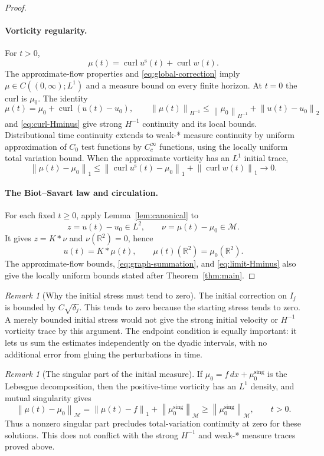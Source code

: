 \documentclass[11pt,a4paper,reqno]{amsart}
\theoremstyle{plain}
\theoremstyle{definition}
\theoremstyle{remark}
\newtheorem{remark}[theorem]{Remark}
\numberwithin{equation}{section}
\newcommand{\R}{\mathbb R}
\newcommand{\M}{\mathcal M}
\newcommand{\curl}{\operatorname{curl}}
\newcommand{\norm}[2]{\left\|#1\right\|_{#2}}
\newcommand{\dd}{\,dx}
\begin{document}
\begin{proof}
\paragraph{Vorticity regularity.}
For $t>0$,
\[
 \mu(t)=\curl u^{\mathrm s}(t)+\curl w(t).
\]
The approximate-flow properties and \eqref{eq:global-correction}
imply
$\mu\in C((0,\infty);L^1)$ and a measure bound on every finite
horizon. At $t=0$ the curl is $\mu_0$. The identity
\begin{equation}\label{eq:limit-Hminus}
 \mu(t)=\mu_0+\curl(u(t)-u_0),\qquad
 \norm{\mu(t)}{H^{-1}}
 \le\norm{\mu_0}{H^{-1}}+\norm{u(t)-u_0}2
\end{equation}
and \eqref{eq:curl-Hminus} give strong $H^{-1}$ continuity and its
local bounds. Distributional time continuity extends to weak-*
measure continuity by uniform approximation of $C_0$ test functions
by $C_c^\infty$ functions, using the locally uniform total variation
bound. When the approximate vorticity has an $L^1$ initial trace,
\[
 \norm{\mu(t)-\mu_0}1
 \le\norm{\curl u^{\mathrm s}(t)-\mu_0}1
                      +\norm{\curl w(t)}1\longrightarrow0.
\]

\paragraph{The Biot--Savart law and circulation.}
For each fixed $t\ge0$, apply Lemma~\ref{lem:canonical} to
\[
 z=u(t)-u_0\in L^2,\qquad\nu=\mu(t)-\mu_0\in\M.
\]
It gives $z=K*\nu$ and $\nu(\R^2)=0$, hence
\[
 u(t)=K*\mu(t),\qquad\mu(t)(\R^2)=\mu_0(\R^2).
\]
The approximate-flow bounds, \eqref{eq:graph-summation}, and
\eqref{eq:limit-Hminus} also give the locally uniform bounds stated
after Theorem~\ref{thm:main}.
\end{proof}

\begin{remark}[Why the initial stress must tend to zero]
The initial correction on $I_j$ is bounded by $C\sqrt{\delta_j}$. This
tends to zero because the starting stress tends to zero. A merely bounded
initial stress would not give the strong initial velocity or
$H^{-1}$ vorticity trace by this argument. The endpoint condition is equally important: it lets us sum the
estimates independently on the dyadic intervals, with no additional
error from gluing the perturbations in time.
\end{remark}

\begin{remark}[The singular part of the initial measure]\label{rem:singular}
If $\mu_0=f\dd+\mu_0^{\mathrm{sing}}$ is the Lebesgue decomposition,
then the positive-time vorticity has an $L^1$ density, and mutual
singularity gives
\[
 \norm{\mu(t)-\mu_0}\M
  =\norm{\mu(t)-f}1+\norm{\mu_0^{\mathrm{sing}}}\M
  \ge\norm{\mu_0^{\mathrm{sing}}}\M,\qquad t>0.
\]
Thus a nonzero singular part precludes total-variation continuity at
zero for these solutions. This does not conflict with the strong
$H^{-1}$ and weak-* measure traces proved above.
\end{remark}
\end{document}
